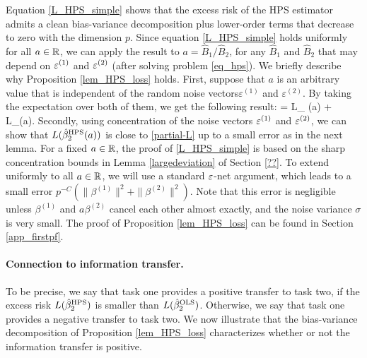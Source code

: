 Equation \eqref{L_HPS_simple} shows that the excess risk of the HPS estimator admits a clean bias-variance decomposition plus lower-order terms that decrease to zero with the dimension $p$.
Since equation \eqref{L_HPS_simple} holds uniformly for all $a\in \mathbb{R}$, we can apply the result to $a = \hat{B}_1 / \hat{B}_2$, for any $\hat{B}_1$ and $\hat{B}_2$ that may depend on ${\varepsilon}^{(1)}$ and ${\varepsilon}^{(2)}$ (after solving problem \eqref{eq_hps}).
We briefly describe why Proposition \ref{lem_HPS_loss} holds.
First, suppose that $a$ is an arbitrary value that is independent of the random noise vectors$ \varepsilon^{(1)}$ and $\varepsilon^{(2)}$.
By taking the expectation over both of them, we get the following result:
\be\label{partial-L}
     = L_{\bias} (a) + L_{\var}(a).
\ee
Secondly, using concentration of the noise vectors ${\varepsilon}^{(1)}$ and ${\varepsilon}^{(2)}$, we can show that $L(\hat{\beta}_2^{\textup{HPS}}(a))$ is close to \eqref{partial-L} up to a small error as in the next lemma.
For a fixed $a\in \mathbb{R}$, the proof of \eqref{L_HPS_simple} is based on the sharp concentration bounds in Lemma \ref{largedeviation} of Section \ref{??}.
To extend uniformly to all $a\in \mathbb{R}$, we will use a standard ${\varepsilon}$-net argument, which leads to a small error $ p^{-C}\left( \|\beta^{(1)} \|^2  +  \|\beta^{(2)} \|^2\right) $. Note that this error is negligible unless $\beta^{(1)}$ and $ a\beta^{(2)}$ cancel each other almost exactly, and the noise variance $\sigma$ is very small.
The proof of Proposition \ref{lem_HPS_loss} can be found in Section  \ref{app_firstpf}.

\paragraph{Connection to information transfer.}
To be precise, we say that task one provides a positive transfer to task two, if the excess risk $L(\hat{\beta}_2^{\textup{HPS}})$ is smaller than $L(\hat{\beta}_2^{\textup{OLS}})$.
Otherwise, we say that task one provides a negative transfer to task two.
We now illustrate that the bias-variance decomposition of Proposition \ref{lem_HPS_loss} characterizes whether or not the information transfer is positive.

